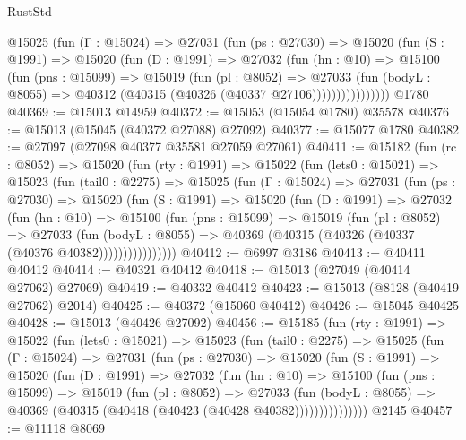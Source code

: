 \begin{lexlean}{RustStd}
\begin{coremodule}
            @15025
              (fun (Γ : @15024) =>
              @27031
                (fun (ps : @27030) =>
                @15020
                  (fun (S : @1991) =>
                  @15020
                    (fun (D : @1991) =>
                    @27032
                      (fun (hn : @10) =>
                      @15100
                        (fun (pns : @15099) =>
                        @15019
                          (fun (pl : @8052) =>
                          @27033
                            (fun (bodyL : @8055) =>
                            @40312 (@40315 (@40326 (@40337 @27106))))))))))))))))
    @1780
@40369 := @15013 @14959
@40372 := @15053 (@15054 @1780) @35578
@40376 := @15013 (@15045 (@40372 @27088) @27092)
@40377 := @15077 @1780
@40382 := @27097 (@27098 @40377 @35581 @27059 @27061)
@40411 := @15182
    (fun (rc : @8052) =>
    @15020
      (fun (rty : @1991) =>
      @15022
        (fun (lets0 : @15021) =>
        @15023
          (fun (tail0 : @2275) =>
          @15025
            (fun (Γ : @15024) =>
            @27031
              (fun (ps : @27030) =>
              @15020
                (fun (S : @1991) =>
                @15020
                  (fun (D : @1991) =>
                  @27032
                    (fun (hn : @10) =>
                    @15100
                      (fun (pns : @15099) =>
                      @15019
                        (fun (pl : @8052) =>
                        @27033
                          (fun (bodyL : @8055) =>
                          @40369 (@40315 (@40326 (@40337 (@40376 @40382))))))))))))))))
@40412 := @6997 @3186
@40413 := @40411 @40412
@40414 := @40321 @40412
@40418 := @15013 (@27049 (@40414 @27062) @27069)
@40419 := @40332 @40412
@40423 := @15013 (@8128 (@40419 @27062) @2014)
@40425 := @40372 (@15060 @40412)
@40426 := @15045 @40425
@40428 := @15013 (@40426 @27092)
@40456 := @15185
    (fun (rty : @1991) =>
    @15022
      (fun (lets0 : @15021) =>
      @15023
        (fun (tail0 : @2275) =>
        @15025
          (fun (Γ : @15024) =>
          @27031
            (fun (ps : @27030) =>
            @15020
              (fun (S : @1991) =>
              @15020
                (fun (D : @1991) =>
                @27032
                  (fun (hn : @10) =>
                  @15100
                    (fun (pns : @15099) =>
                    @15019
                      (fun (pl : @8052) =>
                      @27033
                        (fun (bodyL : @8055) =>
                        @40369 (@40315 (@40418 (@40423 (@40428 @40382)))))))))))))))
    @2145
@40457 := @11118 @8069

\end{coremodule}
\end{lexlean}
